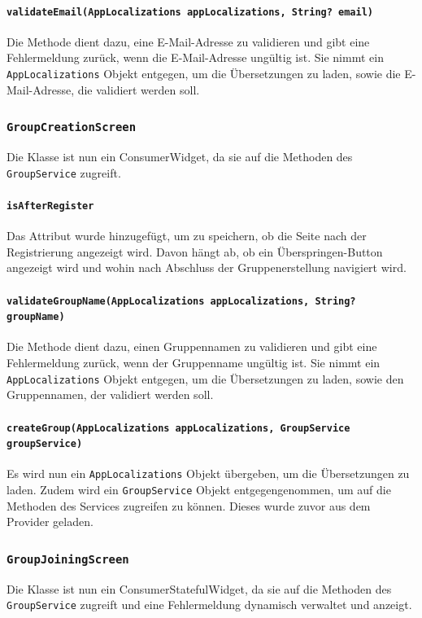 \documentclass{implementierungsheft}
\begin{document}
\paragraph{\texttt{validateEmail(AppLocalizations appLocalizations, String? email)}}
Die Methode dient dazu, eine E-Mail-Adresse zu validieren und gibt eine Fehlermeldung zurück, wenn die E-Mail-Adresse ungültig ist. Sie nimmt ein \texttt{AppLocalizations} Objekt entgegen, um die Übersetzungen zu laden, sowie die E-Mail-Adresse, die validiert werden soll.
\subsubsection{\texttt{GroupCreationScreen}}
Die Klasse ist nun ein ConsumerWidget, da sie auf die Methoden des \texttt{GroupService} zugreift.
\paragraph*{\texttt{isAfterRegister}}
Das Attribut wurde hinzugefügt, um zu speichern, ob die Seite nach der Registrierung angezeigt wird. Davon hängt ab, ob ein Überspringen-Button angezeigt wird und wohin nach Abschluss der Gruppenerstellung navigiert wird.
\paragraph*{\texttt{validateGroupName(AppLocalizations appLocalizations, String? groupName)}}
Die Methode dient dazu, einen Gruppennamen zu validieren und gibt eine Fehlermeldung zurück, wenn der Gruppenname ungültig ist. Sie nimmt ein \texttt{AppLocalizations} Objekt entgegen, um die Übersetzungen zu laden, sowie den Gruppennamen, der validiert werden soll.
\paragraph{\texttt{createGroup(AppLocalizations appLocalizations, GroupService groupService)}}
Es wird nun ein \texttt{AppLocalizations} Objekt übergeben, um die Übersetzungen zu laden. Zudem wird ein \texttt{GroupService} Objekt entgegengenommen, um auf die Methoden des Services zugreifen zu können. Dieses wurde zuvor aus dem Provider geladen.
\subsubsection{\texttt{GroupJoiningScreen}}
Die Klasse ist nun ein ConsumerStatefulWidget, da sie auf die Methoden des \texttt{GroupService} zugreift und eine Fehlermeldung dynamisch verwaltet und anzeigt.
\end{document}
